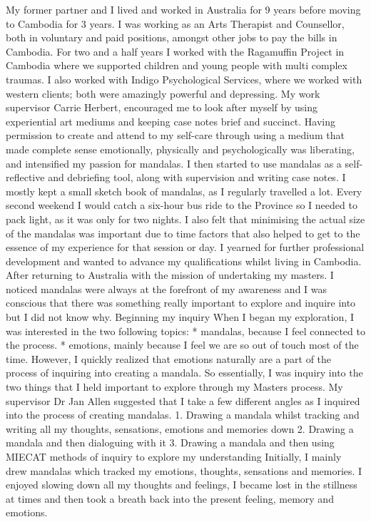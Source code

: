My former partner and I lived and worked in Australia for 9 years before moving to Cambodia for 3 years. I was working as an Arts Therapist and Counsellor, both in voluntary and paid positions, amongst other jobs to pay the bills in Cambodia. For two and a half years I worked with the Ragamuffin Project in Cambodia where we supported children and young people with multi complex traumas. I also worked with Indigo Psychological Services, where we worked with western clients; both were amazingly powerful and depressing. 
My work supervisor Carrie Herbert, encouraged me to look after myself by using experiential art mediums and keeping case notes brief and succinct. Having permission to create and attend to my self-care through using a medium that made complete sense emotionally, physically and psychologically was liberating, and intensified my passion for mandalas. I then started to use mandalas as a self-reflective and debriefing tool, along with supervision and writing case notes. I mostly kept a small sketch book of mandalas, as I regularly travelled a lot. Every second weekend I would catch a six-hour bus ride to the Province so I needed to pack light, as it was only for two nights. I also felt that minimising the actual size of the mandalas was important due to time factors that also helped to get to the essence of my experience for that session or day.
I yearned for further professional development and wanted to advance my qualifications whilst living in Cambodia. After returning to Australia with the mission of undertaking my masters. I noticed mandalas were always at the forefront of my awareness and I was conscious that there was something really important to explore and inquire into but I did not know why.
Beginning my inquiry
When I began my exploration, I was interested in the two following topics:
* mandalas, because I feel connected to the process. 
* emotions, mainly because I feel we are so out of touch most of the time. 
However, I quickly realized that emotions naturally are a part of the process of inquiring into creating a mandala. So essentially, I was inquiry into the two things that I held important to explore through my Masters process.  
My supervisor Dr Jan Allen suggested that I take a few different angles as I inquired into the process of creating mandalas.
1. Drawing a mandala whilst tracking and writing all my thoughts, sensations, emotions and memories down 
2. Drawing a mandala and then dialoguing with it 
3. Drawing a mandala and then using MIECAT methods of inquiry to explore my understanding 
Initially, I mainly drew mandalas which tracked my emotions, thoughts, sensations and memories. I enjoyed slowing down all my thoughts and feelings, I became lost in the stillness at times and then took a breath back into the present feeling, memory and emotions. 
















